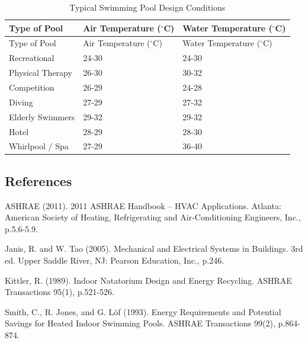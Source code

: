 \begin{longtable}[c]{@{}lll@{}}
\caption{Typical Swimming Pool Design Conditions \label{table:typical-swimming-pool-design-conditions}} \tabularnewline
\toprule
Type of Pool & Air Temperature (\(^{\circ}\)C) & Water Temperature (\(^{\circ}\)C) \tabularnewline
\midrule
\endfirsthead

\toprule
Type of Pool & Air Temperature (\(^{\circ}\)C) & Water Temperature (\(^{\circ}\)C) \tabularnewline
\midrule
\endhead

Recreational & 24-30 & 24-30 \tabularnewline
Physical Therapy & 26-30 & 30-32 \tabularnewline
Competition & 26-29 & 24-28 \tabularnewline
Diving & 27-29 & 27-32 \tabularnewline
Elderly Swimmers & 29-32 & 29-32 \tabularnewline
Hotel & 28-29 & 28-30 \tabularnewline
Whirlpool / Spa & 27-29 & 36-40 \tabularnewline
\bottomrule
\end{longtable}

\subsection{References}\label{references-030}

ASHRAE (2011). 2011 ASHRAE Handbook -- HVAC Applications. Atlanta: American Society of Heating, Refrigerating and Air-Conditioning Engineers, Inc., p.5.6-5.9.

Janis, R. and W. Tao (2005). Mechanical and Electrical Systems in Buildings. 3rd ed. Upper Saddle River, NJ: Pearson Education, Inc., p.246.

Kittler, R. (1989). Indoor Natatorium Design and Energy Recycling. ASHRAE Transactions 95(1), p.521-526.

Smith, C., R. Jones, and G. Löf (1993). Energy Requirements and Potential Savings for Heated Indoor Swimming Pools. ASHRAE Transactions 99(2), p.864-874.
